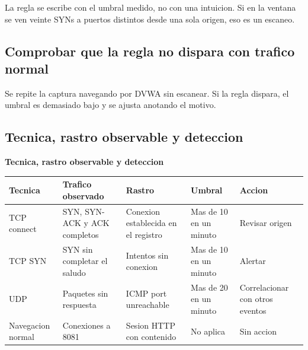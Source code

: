 \documentclass[11pt,a4paper]{article}
\begin{document}
La regla se escribe con el umbral medido, no con una intuicion. Si en la ventana se ven veinte SYNs a puertos distintos desde una sola origen, eso es un escaneo.

\subsection{Comprobar que la regla no dispara con trafico normal}

Se repite la captura navegando por DVWA sin escanear. Si la regla dispara, el umbral es demasiado bajo y se ajusta anotando el motivo.

\subsection{Tecnica, rastro observable y deteccion}

\begin{center}
\begin{minipage}{\linewidth}
\centering
{\footnotesize
\textbf{Tecnica, rastro observable y deteccion}\par\smallskip
\begin{tabular}{@{}>{\raggedright\arraybackslash}p{1.90cm}>{\raggedright\arraybackslash}p{3.40cm}>{\raggedright\arraybackslash}p{3.20cm}>{\raggedright\arraybackslash}p{2.20cm}>{\raggedright\arraybackslash}p{3.20cm}@{}}
\toprule
\textbf{Tecnica} & \textbf{Trafico observado} & \textbf{Rastro} & \textbf{Umbral} & \textbf{Accion} \\
\midrule
TCP connect & SYN, SYN-ACK y ACK completos & Conexion establecida en el registro & Mas de 10 en un minuto & Revisar origen \\
TCP SYN & SYN sin completar el saludo & Intentos sin conexion & Mas de 10 en un minuto & Alertar \\
UDP & Paquetes sin respuesta & ICMP port unreachable & Mas de 20 en un minuto & Correlacionar con otros eventos \\
Navegacion normal & Conexiones a 8081 & Sesion HTTP con contenido & No aplica & Sin accion \\
\bottomrule
\end{tabular}
}
\par{}
\end{minipage}
\end{center}

\end{document}

